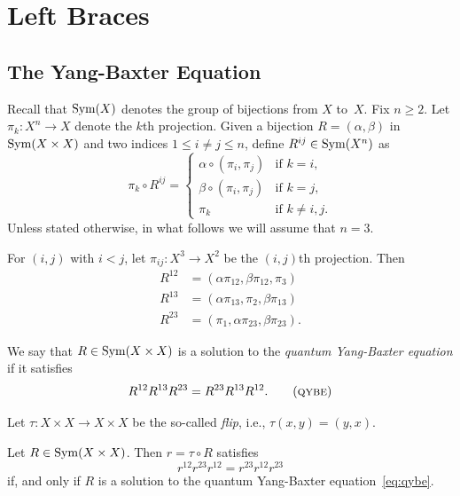\chapter{Left Braces}
\section{The Yang-Baxter Equation}
\setcounter{subsection}{1}

Recall that ${\rm Sym}(X)$ denotes the group of bijections from $X$ to~$X$. Fix $n\ge2$. Let $\pi_k\colon X^n\to X$ denote the $k$th projection. Given a bijection $R=(\alpha,\beta)$ in ${\rm Sym}(X\times X)$ and two indices $1\le i\ne j\le n$, define $R^{ij}\in{\rm Sym}(X^n)$ as
$$
    \pi_k\circ R^{ij} = \begin{cases}
        \alpha\circ(\pi_i,\pi_j)    &\text{if }k=i,\\
        \beta\circ(\pi_i,\pi_j)     &\text{if }k=j,\\
        \pi_k   &\text{if }k\ne i,j.
    \end{cases}
$$
Unless stated otherwise, in what follows we will assume that $n=3$.

For $(i,j)$ with $i<j$, let $\pi_{ij}\colon X^3\to X^2$ be the $(i,j)$th projection. Then
\begin{align}\label{eq:R^ij-i<j}
    R^{12} &= (\alpha\pi_{12},\beta\pi_{12},\pi_3)\nonumber\\
    R^{13} &= (\alpha\pi_{13},\pi_2,\beta\pi_{13})\\
    R^{23} &= (\pi_1,\alpha\pi_{23},\beta\pi_{23}).\nonumber
\end{align}


\begin{defn}
    We say that\/ $R\in{\rm Sym}(X\times X)$ is a solution to the \textsl{quantum Yang-Baxter equation} if it satisfies
    \begin{equation}\label{eq:qybe}
        R^{12}R^{13}R^{23} = R^{23}R^{13}R^{12}.\tag{\textsc{qybe}} 
    \end{equation}
\end{defn}

Let $\tau\colon X\times X\to X\times X$ be the so-called \textsl{flip}, i.e., $\tau(x,y)=(y,x)$.


\begin{prop}
    Let\/ $R\in{\rm Sym}(X\times X)$. Then\/ $r=\tau\circ R$ satisfies
    \begin{equation}\label{eq:ybe}
        r^{12}r^{23}r^{12} = r^{23}r^{12}r^{23}
    \end{equation}
    if, and only if\/ $R$ is a solution to the quantum Yang-Baxter equation\/~\eqref{eq:qybe}.
\end{prop}

